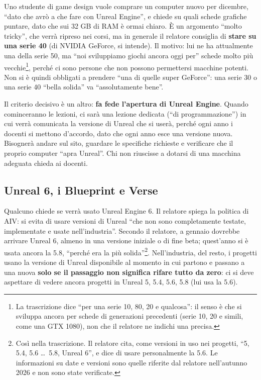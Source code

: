 Uno studente di game design vuole comprare un computer nuovo per dicembre,
``dato che avrò a che fare con Unreal Engine'', e chiede su quali schede
grafiche puntare, dato che sui 32 GB di RAM è ormai chiaro. È un argomento
``molto tricky'', che verrà ripreso nei corsi, ma in generale il relatore
consiglia di \textbf{stare su una serie 40} (di NVIDIA GeForce, si
intende). Il motivo: lui ne ha attualmente una della serie 50, ma ``noi
sviluppiamo giochi ancora oggi per'' schede molto più vecchie\footnote{La
trascrizione dice ``per una serie 10, 80, 20 e qualcosa'': il senso è che
si sviluppa ancora per schede di generazioni precedenti (serie 10, 20 e
simili, come una GTX 1080), non che il relatore ne indichi una precisa.},
perché ci sono persone che non possono permettersi macchine potenti. Non si
è quindi obbligati a prendere ``una di quelle super GeForce'': una serie 30
o una serie 40 ``bella solida'' va ``assolutamente bene''.

Il criterio decisivo è un altro: \textbf{fa fede l'apertura di Unreal
Engine}. Quando cominceranno le lezioni, ci sarà una lezione dedicata (``di
programmazione'') in cui verrà comunicata la versione di Unreal che si
userà, perché ogni anno i docenti si mettono d'accordo, dato che ogni anno
esce una versione nuova. Bisognerà andare sul sito, guardare le specifiche
richieste e verificare che il proprio computer ``apra Unreal''. Chi non
riuscisse a dotarsi di una macchina adeguata chieda ai docenti.

\subsection{Unreal 6, i Blueprint e Verse}

Qualcuno chiede se verrà usato Unreal Engine 6. Il relatore spiega la
politica di AIV: si evita di usare versioni di Unreal ``che non sono
completamente testate, implementate e usate nell'industria''. Secondo il
relatore, a gennaio dovrebbe arrivare Unreal 6, almeno in una versione
iniziale o di fine beta; quest'anno si è usata ancora la 5.8, ``perché era
la più solida''\footnote{Così nella trascrizione. Il relatore cita, come
versioni in uso nei progetti, ``5, 5.4, 5.6 \ldots\ 5.8, Unreal 6'', e dice
di usare personalmente la 5.6. Le informazioni su date e versioni sono
quelle riferite dal relatore nell'autunno 2026 e non sono state
verificate.}. Nell'industria, del resto, i progetti usano la versione di
Unreal disponibile al momento in cui partono e passano a una nuova
\textbf{solo se il passaggio non significa rifare tutto da zero}: ci si deve
aspettare di vedere ancora progetti in Unreal 5, 5.4, 5.6, 5.8 (lui usa la
5.6).

